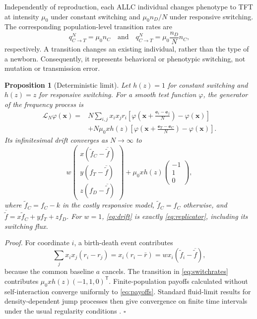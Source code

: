 \documentclass[pdflatex,sn-mathphys-ay]{sn-jnl}
\theoremstyle{thmstyleone}
\newtheorem{proposition}{Proposition}
\begin{document}
Independently of reproduction, each ALLC individual changes phenotype to TFT at intensity $\mu_0$ under constant switching and $\mu_0n_D/N$ under responsive switching. The corresponding population-level transition rates are
\begin{equation}
q_{C\to T}^{N}=\mu_0n_C
\quad\text{and}\quad
q_{C\to T}^{N}=\mu_0\frac{n_D}{N}n_C,
\label{eq:switchrates}
\end{equation}
respectively. A transition changes an existing individual, rather than the type of a newborn. Consequently, it represents behavioral or phenotypic switching, not mutation or transmission error.

\begin{proposition}[Deterministic limit]
Let $h(z)=1$ for constant switching and $h(z)=z$ for responsive switching. For a smooth test function $\varphi$, the generator of the frequency process is
\begin{align}
\mathcal L_N\varphi(\boldsymbol x)
={}&N\sum_{i,j}x_ix_jr_i
\left[\varphi\!\left(\boldsymbol x+\frac{\boldsymbol e_i-\boldsymbol e_j}{N}\right)-\varphi(\boldsymbol x)\right]\nonumber\\
&+N\mu_0xh(z)
\left[\varphi\!\left(\boldsymbol x+\frac{\boldsymbol e_T-\boldsymbol e_C}{N}\right)-\varphi(\boldsymbol x)\right].
\label{eq:generator}
\end{align}
Its infinitesimal drift converges as $N\to\infty$ to
\begin{equation}
w\begin{pmatrix}
x(\widetilde f_C-\overline{\widetilde f})\\
y(f_T-\overline{\widetilde f})\\
z(f_D-\overline{\widetilde f})
\end{pmatrix}
+\mu_0xh(z)
\begin{pmatrix}-1\\1\\0\end{pmatrix},
\label{eq:drift}
\end{equation}
where $\widetilde f_C=f_C-k$ in the costly responsive model, $\widetilde f_C=f_C$ otherwise, and $\overline{\widetilde f}=x\widetilde f_C+yf_T+zf_D$. For $w=1$, \eqref{eq:drift} is exactly \eqref{eq:replicator}, including its switching flux.
\end{proposition}

\noindent\emph{Proof.}
For coordinate $i$, a birth-death event contributes
\begin{equation}
\sum_j x_ix_j(r_i-r_j)
=x_i(r_i-\bar r)
=wx_i(\widetilde f_i-\overline{\widetilde f}),
\end{equation}
because the common baseline $a$ cancels. The transition in \eqref{eq:switchrates} contributes $\mu_0xh(z)(-1,1,0)^\mathsf T$. Finite-population payoffs calculated without self-interaction converge uniformly to \eqref{eq:payoffs}. Standard fluid-limit results for density-dependent jump processes then give convergence on finite time intervals under the usual regularity conditions \citep{kurtz1970}. \hfill$\square$
\end{document}
